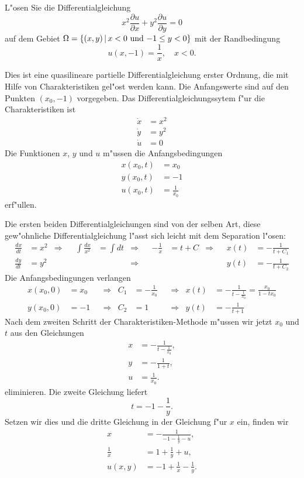 L"osen Sie die Differentialgleichung
\[
x^2\frac{\partial u}{\partial x}+y^2\frac{\partial u}{\partial y}=0
\]
auf dem Gebiet $\Omega=\{(x,y)\,|\,\text{$ x< 0$ und $-1\le y<0$}\}$ mit der Randbedingung
\[
u(x,-1)=\frac1x,\quad x<0.
\]

\begin{loesung}
Dies ist eine quasilineare partielle Differentialgleichung
erster Ordnung, die mit Hilfe von Charakteristiken gel"ost werden
kann.
Die Anfangswerte sind auf den Punkten $(x_0,-1)$ vorgegeben.
Das Differentialgleichungssytem f"ur die Charakteristiken ist
\begin{align*}
\dot x&=x^2\\
\dot y&=y^2\\
\dot u&=0
\end{align*}
Die Funktionen $x$, $y$ und $u$ m"ussen die Anfangsbedingungen
\begin{align*}
x(x_0,t)&=x_0\\
y(x_0,t)&=-1\\
u(x_0,t)&=\frac1{x_0}
\end{align*}
erf"ullen.

Die ersten beiden Differentialgleichungen sind von der selben Art, diese
gew"ohnliche Differentialgleichung l"asst sich leicht mit dem Separation l"osen:
\begin{align*}
\frac{dx}{dt}&=x^2
&\Rightarrow&
&\int\frac{dx}{x^2}&=\int dt
&\Rightarrow&
&-\frac1x&=t+C
&\Rightarrow&
&x(t)&=-\frac1{t+C_1}
\\
\frac{dy}{dt}&=y^2
&&
&&
&\Rightarrow&
&&
&&
&y(t)&=-\frac1{t+C_2}
\end{align*}
Die Anfangsbedingungen verlangen
\begin{align*}
x(x_0,0)&=x_0&&\Rightarrow&C_1&=-\frac1{x_0}&&\Rightarrow&x(t)&=-\frac1{t-\frac1{x_0}}=\frac{x_0}{1-tx_0}\\
y(x_0,0)&=-1&&\Rightarrow&C_2&=1&&\Rightarrow&y(t)&=-\frac1{t+1}
\end{align*}
Nach dem zweiten Schritt der Charakteristiken-Methode m"ussen wir jetzt
$x_0$ und $t$ aus den Gleichungen
\begin{align*}
x&=-\frac{1}{t-\frac1{x_0}},\\
y&=-\frac{1}{1+t},\\
u&=\frac1{x_0}.
\end{align*}
eliminieren.
Die zweite Gleichung liefert
\[
t=-1-\frac1{y}.
\]
Setzen wir dies und die dritte Gleichung in der Gleichung f"ur $x$ ein,
finden wir
\begin{align*}
x&=-\frac{1}{-1-\frac1y-u},\\
\frac1x&=1+\frac1y+u,\\
u(x,y)&=-1+\frac1x-\frac1y.
\end{align*}


\end{loesung}
